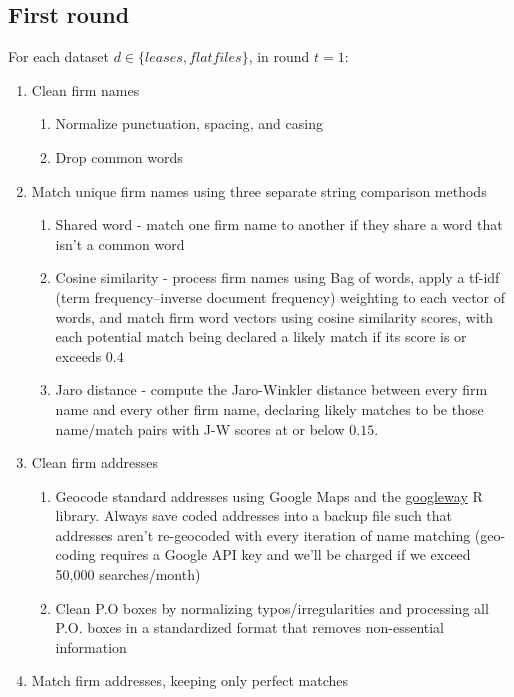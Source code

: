 \documentclass{article}
\begin{document}
\subsection{First round}
For each dataset $d \in \{leases, flatfiles\}$, in round $t =  1$:
\begin{enumerate}
    \item Clean firm names 
    \begin{enumerate}
    \item Normalize punctuation, spacing, and casing
    \item Drop common words
    \end{enumerate}
    
    \item Match unique firm names using three separate string comparison methods
     \begin{enumerate}
    \item Shared word - match one firm name to another if they share a word that isn't a common word
    \item Cosine similarity - process firm names using Bag of words, apply a tf-idf (term frequency–inverse document frequency) weighting to each vector of words, and match firm word vectors using cosine similarity scores, with each potential match being declared a likely match if its score is or exceeds $0.4$ 
     \item Jaro distance - compute the Jaro-Winkler distance between every firm name and every other firm name, declaring likely matches to be those name/match pairs with J-W scores at or below $0.15$. 
    \end{enumerate}
    
    \item Clean firm addresses 
    \begin{enumerate}
    \item Geocode standard addresses using Google Maps and the \href{https://cran.r-project.org/web/packages/googleway/googleway.pdf}{googleway} R library. Always save coded addresses into a backup file such that addresses aren't re-geocoded with every iteration of name matching (geo-coding requires a Google API key and we'll be charged if we exceed 50,000 searches/month) 
    \item Clean P.O boxes by normalizing typos/irregularities and processing all P.O. boxes in a standardized format that removes non-essential information
    \end{enumerate}
    
    \item Match firm addresses, keeping only perfect matches


\end{enumerate}
\end{document}
